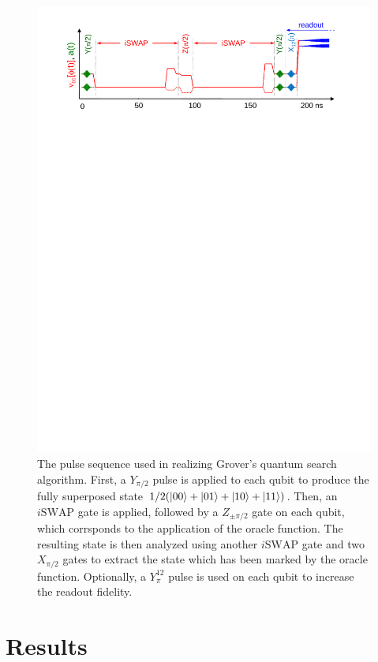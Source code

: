 \begin{figure}[htb!]
	\centering
		\includegraphics[width=1.\textwidth]{./material/papers/grover/figures/grover_algorithm_pulse_sequence}
	\caption[Pulse sequence used for implementing Grovers search algorithm]{The pulse sequence used in realizing Grover's quantum search algorithm. First, a $Y_{\pi/2}$ pulse is applied to each qubit to produce the fully superposed state $1/2(\left| 00 \right>+\left| 01 \right>+\left| 10 \right>+\left| 11 \right>)$. Then, an $i\mathrm{SWAP}$ gate is applied, followed by a $Z_{\pm \pi /2}$ gate on each qubit, which corrsponds to the application of the oracle function. The resulting state is then analyzed using another $i\mathrm{SWAP}$ gate and two $X_{\pi/2}$ gates to extract the state which has been marked by the oracle function. Optionally, a $Y^{12}_{\pi}$ pulse is used on each qubit to increase the readout fidelity.}
	\label{fig:GroverPulseSequence}
\end{figure}

\section{Results}

